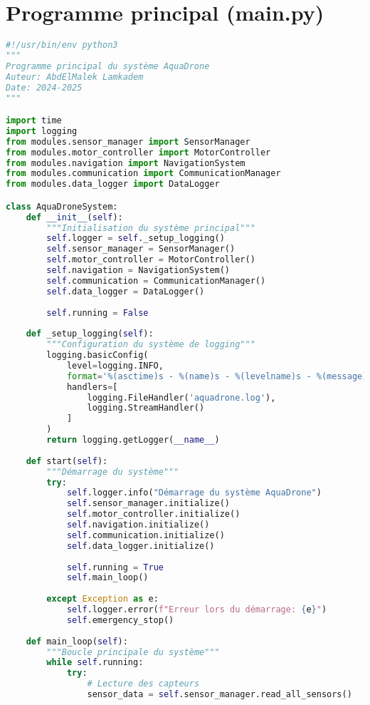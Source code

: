 \section{Programme principal (main.py)}
\begin{lstlisting}[language=Python, caption=Programme principal du système, label=lst:main-program]
#!/usr/bin/env python3
"""
Programme principal du système AquaDrone
Auteur: AbdElMalek Lamkadem
Date: 2024-2025
"""

import time
import logging
from modules.sensor_manager import SensorManager
from modules.motor_controller import MotorController
from modules.navigation import NavigationSystem
from modules.communication import CommunicationManager
from modules.data_logger import DataLogger

class AquaDroneSystem:
    def __init__(self):
        """Initialisation du système principal"""
        self.logger = self._setup_logging()
        self.sensor_manager = SensorManager()
        self.motor_controller = MotorController()
        self.navigation = NavigationSystem()
        self.communication = CommunicationManager()
        self.data_logger = DataLogger()
        
        self.running = False
        
    def _setup_logging(self):
        """Configuration du système de logging"""
        logging.basicConfig(
            level=logging.INFO,
            format='%(asctime)s - %(name)s - %(levelname)s - %(message)s',
            handlers=[
                logging.FileHandler('aquadrone.log'),
                logging.StreamHandler()
            ]
        )
        return logging.getLogger(__name__)
    
    def start(self):
        """Démarrage du système"""
        try:
            self.logger.info("Démarrage du système AquaDrone")
            self.sensor_manager.initialize()
            self.motor_controller.initialize()
            self.navigation.initialize()
            self.communication.initialize()
            self.data_logger.initialize()
            
            self.running = True
            self.main_loop()
            
        except Exception as e:
            self.logger.error(f"Erreur lors du démarrage: {e}")
            self.emergency_stop()
    
    def main_loop(self):
        """Boucle principale du système"""
        while self.running:
            try:
                # Lecture des capteurs
                sensor_data = self.sensor_manager.read_all_sensors()
                

\end{lstlisting}
